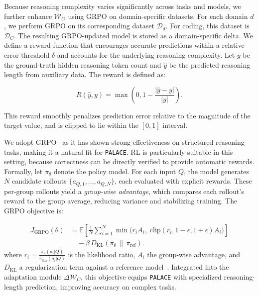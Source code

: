 \documentclass[pdflatex,sn-mathphys-num]{sn-jnl}%
\newcommand{\n}{\texttt{PALACE}\xspace}
\theoremstyle{thmstyleone}%
\theoremstyle{thmstyletwo}%
\theoremstyle{thmstylethree}%
\begin{document}
Because reasoning complexity varies significantly across tasks and models, we further enhance $\mathcal{W}_G$ using GRPO on domain-specific datasets. For each domain \(d\), we perform GRPO on its corresponding dataset \(\mathcal{D}_d\). For coding, this dataset is \(\mathcal{D}_C\). The resulting GRPO-updated model is stored as a domain-specific delta.
We define a reward function that encourages accurate predictions within a relative error threshold $\delta$ and accounts for the underlying reasoning complexity. Let $y$ be the ground-truth hidden reasoning token count and $\hat{y}$ be the predicted reasoning length from auxiliary data. 
The reward is defined as:

\begin{equation}
R(\hat{y}, y) = \max\left(0, 1 - \frac{|\hat{y} - y|}{|y|}\right).
\end{equation}
 
This reward smoothly penalizes prediction error relative to the magnitude of the target value, and is clipped to lie within the $[0, 1]$ interval.


We adopt GRPO~\citep{shao2024deepseekmath} as it has shown strong effectiveness on structured reasoning tasks, making it a natural fit for {\n}. RL is particularly suitable in this setting, because correctness can be directly verified to provide automatic rewards. Formally, let $\pi_\theta$ denote the policy model. For each input $Q$, the model generates $N$ candidate rollouts $\{a_{Q,1},...,a_{Q,N}\}$, each evaluated with explicit rewards. These per-group rollouts yield a \textit{group-wise advantage}, which compares each rollout’s reward to the group average, reducing variance and stabilizing training. The GRPO objective is: 

{\small
\begin{equation}
\begin{aligned}
J_{\text{GRPO}}(\theta)
&= \mathbb{E}\!\left[
\frac{1}{N}\sum_{i=1}^N
\min\!\Big(
r_i A_i,\;
\mathrm{clip}(r_i, 1-\epsilon, 1+\epsilon)A_i
\Big)
\right] \\
&\quad - \beta\, D_{\text{KL}}\!\left(\pi_\theta \,\|\, \pi_{\text{ref}}\right).
\end{aligned}
\end{equation}}
where $r_i=\tfrac{\pi_\theta(a_i|Q)}{\pi_{\theta_{\text{old}}}(a_i|Q)}$ is the likelihood ratio, $A_i$ the group-wise advantage, and $D_{\text{KL}}$ a regularization term against a reference model~\citep{ouyang2022training}.  
Integrated into the adaptation module $\Delta \mathcal{W}_C$, this objective equips {\n} with specialized reasoning-length prediction, improving accuracy on complex tasks.  
\end{document}
